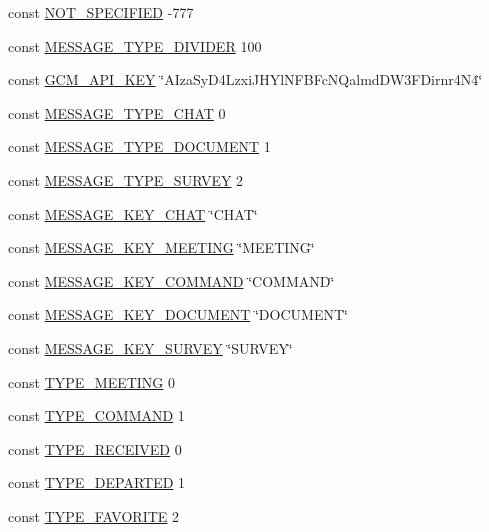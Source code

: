\begin{DoxyCompactItemize}
\item 
const \hyperlink{message_8php_aca08c778f12788e40be4c3f1fb4fe553}{N\-O\-T\-\_\-\-S\-P\-E\-C\-I\-F\-I\-E\-D} -\/777
\item 
const \hyperlink{message_8php_a6d8980010865311fe2678598bc736f09}{M\-E\-S\-S\-A\-G\-E\-\_\-\-T\-Y\-P\-E\-\_\-\-D\-I\-V\-I\-D\-E\-R} 100
\item 
const \hyperlink{message_8php_a96f252b1f4aeb8e0bc43ebb0d631210e}{G\-C\-M\-\_\-\-A\-P\-I\-\_\-\-K\-E\-Y} \char`\"{}A\-Iza\-Sy\-D4\-Lzxi\-J\-H\-Yl\-N\-F\-B\-Fc\-N\-Qalmd\-D\-W3\-F\-Dirnr4\-N4\char`\"{}
\item 
const \hyperlink{message_8php_a1836edbb3f14701638c3894c13b5df17}{M\-E\-S\-S\-A\-G\-E\-\_\-\-T\-Y\-P\-E\-\_\-\-C\-H\-A\-T} 0
\item 
const \hyperlink{message_8php_a1030f7af01d4a4e3edd389cf7736bf78}{M\-E\-S\-S\-A\-G\-E\-\_\-\-T\-Y\-P\-E\-\_\-\-D\-O\-C\-U\-M\-E\-N\-T} 1
\item 
const \hyperlink{message_8php_a6dedd7c13a89aceb3d47f52bf8c889ae}{M\-E\-S\-S\-A\-G\-E\-\_\-\-T\-Y\-P\-E\-\_\-\-S\-U\-R\-V\-E\-Y} 2
\item 
const \hyperlink{message_8php_abeafb1a8363ce63d83c9e3ffab3d8181}{M\-E\-S\-S\-A\-G\-E\-\_\-\-K\-E\-Y\-\_\-\-C\-H\-A\-T} \char`\"{}C\-H\-A\-T\char`\"{}
\item 
const \hyperlink{message_8php_a5fb98b7872bf9bc67bb3d80bf43671e0}{M\-E\-S\-S\-A\-G\-E\-\_\-\-K\-E\-Y\-\_\-\-M\-E\-E\-T\-I\-N\-G} \char`\"{}M\-E\-E\-T\-I\-N\-G\char`\"{}
\item 
const \hyperlink{message_8php_a38f9483cc25d08286ff8fcd70c576a66}{M\-E\-S\-S\-A\-G\-E\-\_\-\-K\-E\-Y\-\_\-\-C\-O\-M\-M\-A\-N\-D} \char`\"{}C\-O\-M\-M\-A\-N\-D\char`\"{}
\item 
const \hyperlink{message_8php_abf917cfbb3ec6e7c6d62277047b1fbc6}{M\-E\-S\-S\-A\-G\-E\-\_\-\-K\-E\-Y\-\_\-\-D\-O\-C\-U\-M\-E\-N\-T} \char`\"{}D\-O\-C\-U\-M\-E\-N\-T\char`\"{}
\item 
const \hyperlink{message_8php_a9b59141152cddada60d91d528a76b30d}{M\-E\-S\-S\-A\-G\-E\-\_\-\-K\-E\-Y\-\_\-\-S\-U\-R\-V\-E\-Y} \char`\"{}S\-U\-R\-V\-E\-Y\char`\"{}
\item 
const \hyperlink{message_8php_a91ca9d22f7afc9ba7d74ac47d2ec3083}{T\-Y\-P\-E\-\_\-\-M\-E\-E\-T\-I\-N\-G} 0
\item 
const \hyperlink{message_8php_adf3919605db7588700f8674a21d82bc2}{T\-Y\-P\-E\-\_\-\-C\-O\-M\-M\-A\-N\-D} 1
\item 
const \hyperlink{message_8php_a0a4e636ce4eb94265bbb9ef8cbef792f}{T\-Y\-P\-E\-\_\-\-R\-E\-C\-E\-I\-V\-E\-D} 0
\item 
const \hyperlink{message_8php_a33110e40ed6fa2d575bb92ada6ccdae2}{T\-Y\-P\-E\-\_\-\-D\-E\-P\-A\-R\-T\-E\-D} 1
\item 
const \hyperlink{message_8php_afa395beb3483fdabd0d5ce8ce353e616}{T\-Y\-P\-E\-\_\-\-F\-A\-V\-O\-R\-I\-T\-E} 2
\end{DoxyCompactItemize}


